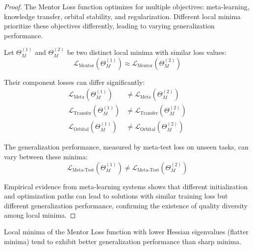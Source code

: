 \begin{proof}
The Mentor Loss function optimizes for multiple objectives: meta-learning, knowledge transfer, orbital stability, and regularization. Different local minima prioritize these objectives differently, leading to varying generalization performance.

Let $\Theta_M^{(1)}$ and $\Theta_M^{(2)}$ be two distinct local minima with similar loss values:
\begin{equation}
\mathcal{L}_{\text{Mentor}}(\Theta_M^{(1)}) \approx \mathcal{L}_{\text{Mentor}}(\Theta_M^{(2)})
\end{equation}

Their component losses can differ significantly:
\begin{align}
\mathcal{L}_{\text{Meta}}(\Theta_M^{(1)}) &\neq \mathcal{L}_{\text{Meta}}(\Theta_M^{(2)}) \\
\mathcal{L}_{\text{Transfer}}(\Theta_M^{(1)}) &\neq \mathcal{L}_{\text{Transfer}}(\Theta_M^{(2)}) \\
\mathcal{L}_{\text{Orbital}}(\Theta_M^{(1)}) &\neq \mathcal{L}_{\text{Orbital}}(\Theta_M^{(2)})
\end{align}

The generalization performance, measured by meta-test loss on unseen tasks, can vary between these minima:
\begin{equation}
\mathcal{L}_{\text{Meta-Test}}(\Theta_M^{(1)}) \neq \mathcal{L}_{\text{Meta-Test}}(\Theta_M^{(2)})
\end{equation}

Empirical evidence from meta-learning systems shows that different initialization and optimization paths can lead to solutions with similar training loss but different generalization performance, confirming the existence of quality diversity among local minima.
\end{proof}

\begin{theorem}
Local minima of the Mentor Loss function with lower Hessian eigenvalues (flatter minima) tend to exhibit better generalization performance than sharp minima.
\end{theorem}

